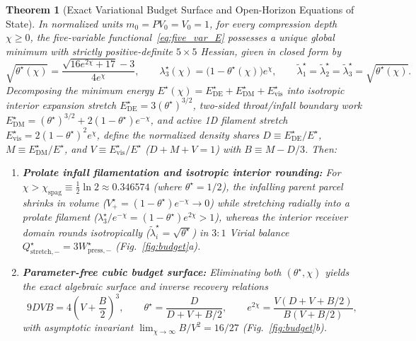 \documentclass[pdflatex,sn-mathphys-num]{sn-jnl}
\theoremstyle{thmstyleone}
\newtheorem{theorem}{Theorem}
\theoremstyle{thmstyletwo}
\theoremstyle{thmstylethree}
\begin{document}
\begin{theorem}[Exact Variational Budget Surface and Open-Horizon Equations of State]\label{thm:budget}
In normalized units $m_0 = PV_0 = V_0 = 1$, for every compression depth $\chi \ge 0$, the five-variable functional~\eqref{eq:five_var_E} possesses a unique global minimum with strictly positive-definite $5\times 5$ Hessian, given in closed form by
\begin{equation}\label{eq:five_var_min}
\sqrt{\theta^\star(\chi)} = \frac{\sqrt{16e^{2\chi} + 17} - 3}{4e^\chi}, \qquad \lambda_3^\star(\chi) = \big(1 - \theta^\star(\chi)\big)e^\chi, \qquad \tilde{\lambda}_1^\star = \tilde{\lambda}_2^\star = \tilde{\lambda}_3^\star = \sqrt{\theta^\star(\chi)}.
\end{equation}
Decomposing the minimum energy $E^\star(\chi) = E_{\mathrm{DE}}^\star + E_{\mathrm{DM}}^\star + E_{\mathrm{vis}}^\star$ into isotropic interior expansion stretch $E_{\mathrm{DE}}^\star = 3(\theta^\star)^{3/2}$, two-sided throat/infall boundary work $E_{\mathrm{DM}}^\star = (\theta^\star)^{3/2} + 2(1-\theta^\star)e^{-\chi}$, and active 1D filament stretch $E_{\mathrm{vis}}^\star = 2(1-\theta^\star)^2 e^\chi$, define the normalized density shares $D \equiv E_{\mathrm{DE}}^\star / E^\star$, $M \equiv E_{\mathrm{DM}}^\star / E^\star$, and $V \equiv E_{\mathrm{vis}}^\star / E^\star$ ($D + M + V = 1$) with $B \equiv M - D/3$. Then:
\begin{enumerate}
\item \textbf{Prolate infall filamentation and isotropic interior rounding:} For $\chi > \chi_{\mathrm{spag}} \equiv \frac{1}{2}\ln 2 \approx 0.346574$ (where $\theta^\star = 1/2$), the infalling parent parcel shrinks in volume ($V_+^\star = (1-\theta^\star)e^{-\chi} \to 0$) while stretching radially into a prolate filament ($\lambda_3^\star / e^{-\chi} = (1-\theta^\star)e^{2\chi} > 1$), whereas the interior receiver domain rounds isotropically ($\tilde{\lambda}_i^\star = \sqrt{\theta^\star}$) in $3:1$ Virial balance $Q_{\mathrm{stretch},-}^\star = 3W_{\mathrm{press},-}^\star$ (Fig.~\ref{fig:budget}a).
\item \textbf{Parameter-free cubic budget surface:} Eliminating both $(\theta^\star,\chi)$ yields the exact algebraic surface and inverse recovery relations
\begin{equation}\label{eq:cubic_budget}
9DVB = 4\left(V + \frac{B}{2}\right)^3, \qquad \theta^\star = \frac{D}{D + V + B/2}, \qquad e^{2\chi} = \frac{V(D + V + B/2)}{B(V + B/2)},
\end{equation}
with asymptotic invariant $\lim_{\chi\to\infty} B/V^2 = 16/27$ (Fig.~\ref{fig:budget}b).

\end{enumerate}
\end{theorem}
\end{document}
